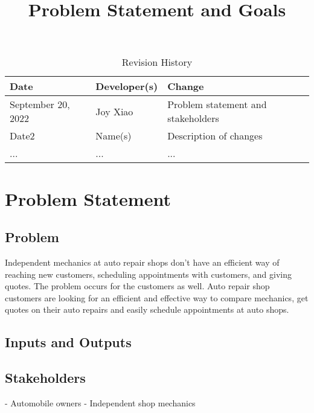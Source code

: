 \documentclass{article}
\title{Problem Statement and Goals\\\progname}
\author{\authname}
\date{}
\begin{document}
\maketitle

\begin{table}[hp]
\caption{Revision History} \label{TblRevisionHistory}
\begin{tabularx}{\textwidth}{llX}
\toprule
\textbf{Date} & \textbf{Developer(s)} & \textbf{Change}\\
\midrule
September 20, 2022 & Joy Xiao & Problem statement and stakeholders\\
Date2 & Name(s) & Description of changes\\
... & ... & ...\\
\bottomrule
\end{tabularx}
\end{table}

\section{Problem Statement}


\subsection{Problem}
Independent mechanics at auto repair shops don't have an efficient way of reaching new customers, scheduling appointments with customers, and giving quotes. The problem occurs for the customers as well. Auto repair shop customers are looking for an efficient and effective way to compare mechanics, get quotes on their auto repairs and easily schedule appointments at auto shops.

\subsection{Inputs and Outputs}


\subsection{Stakeholders}
- Automobile owners
- Independent shop mechanics
\end{document}

